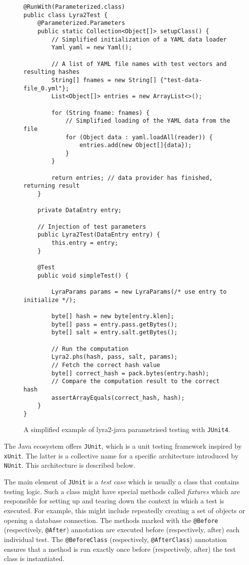 \begin{figure}
\small
\begin{verbatim}
@RunWith(Parameterized.class)
public class Lyra2Test {
    @Parameterized.Parameters
    public static Collection<Object[]> setupClass() {
        // Simplified initialization of a YAML data loader
        Yaml yaml = new Yaml();

        // A list of YAML file names with test vectors and resulting hashes
        String[] fnames = new String[] {"test-data-file_0.yml"};
        List<Object[]> entries = new ArrayList<>();

        for (String fname: fnames) {
            // Simplified loading of the YAML data from the file
            for (Object data : yaml.loadAll(reader)) {
                entries.add(new Object[]{data});
            }
        }

        return entries; // data provider has finished, returning result
    }

    private DataEntry entry;

    // Injection of test parameters
    public Lyra2Test(DataEntry entry) {
        this.entry = entry;
    }

    @Test
    public void simpleTest() {

        LyraParams params = new LyraParams(/* use entry to initialize */);

        byte[] hash = new byte[entry.klen];
        byte[] pass = entry.pass.getBytes();
        byte[] salt = entry.salt.getBytes();

        // Run the computation
        Lyra2.phs(hash, pass, salt, params);
        // Fetch the correct hash value
        byte[] correct_hash = pack.bytes(entry.hash);
        // Compare the computation result to the correct hash
        assertArrayEquals(correct_hash, hash);
    }
}
\end{verbatim}
\normalsize
\caption{A simplified example of lyra2-java parametrised testing with \texttt{JUnit4}.}
\label{fig:junit4-parametrization}
\end{figure}

The Java ecosystem offers \texttt{JUnit}, which is a unit testing framework inspired by \texttt{xUnit}. The latter is a collective name for a specific architecture introduced by \texttt{NUnit}. This architecture is described below.

The main element of \texttt{JUnit} is a \emph{test case} which is usually a class that contains testing logic. Such a class might have special methods called \emph{fixtures} which are responsible for setting up and tearing down the context in which a test is executed. For example, this might include repeatedly creating a set of objects or opening a database connection. The methods marked with the \texttt{@Before} (respectively, \texttt{@After}) annotation are executed before (respectively, after) each individual test. The \texttt{@BeforeClass} (respectively, \texttt{@AfterClass}) annotation ensures that a method is run exactly once before (respectively, after) the test class is instantiated.

